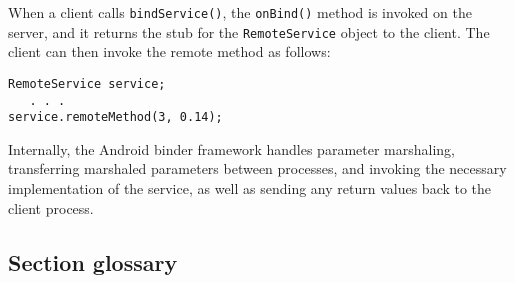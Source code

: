 When a client calls \texttt{bindService()}, the \texttt{onBind()} method is invoked on the server, and it returns the stub for the \texttt{RemoteService} object to the client. The client can then invoke the remote method as follows:
\begin{verbatim}
RemoteService service;
   . . .
service.remoteMethod(3, 0.14);
\end{verbatim}
Internally, the Android binder framework handles parameter marshaling, transferring marshaled parameters between processes, and invoking the necessary implementation of the service, as well as sending any return values back to the client process.

\subsection*{Section glossary}
\centering
